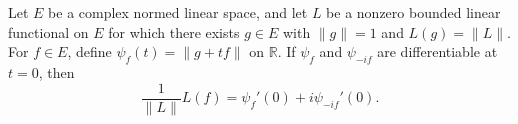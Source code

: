 Let $E$ be a complex normed linear space, and let $L$ be a nonzero bounded linear functional on $E$ for which there exists $g \in E$ with $\|g\| = 1$ and $L(g) = \|L\|$. For $f \in E$, define $\psi_f(t) = \|g + tf\|$ on $\mathbb{R}$. If $\psi_f$ and $\psi_{-if}$ are differentiable at $t = 0$, then
$$\frac{1}{\|L\|} L(f) = \psi_f'(0) + i \psi_{-if}'(0).$$

